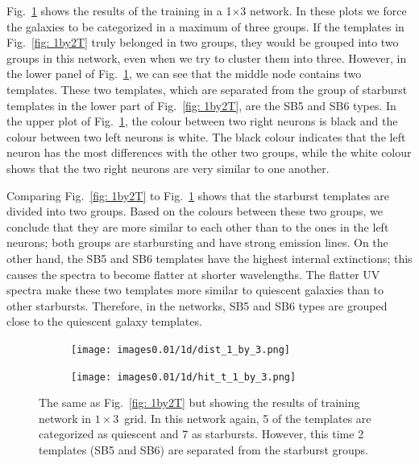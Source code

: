             Fig.~\ref{fig: 1by3T} shows the results of the training in a 1$\times$3 network.
            In these plots we force the galaxies to be categorized in a maximum of three groups. 
            If the templates in Fig.~\ref{fig: 1by2T} truly belonged in two groups, they would be grouped into two groups in this network, even when we try to cluster them into three. 
            However, in the lower panel of Fig.~\ref{fig: 1by3T}, we can see that the middle node contains two templates.
            These two templates, which are separated from the group of starburst templates in the lower part of Fig.~\ref{fig: 1by2T},  are the SB5 and SB6 types.
            In the upper plot of Fig.~\ref{fig: 1by3T}, the colour between two right neurons is black and the colour between two left neurons is white. 
            The black colour indicates that the left neuron has the most differences with the other two groups,
            while the white colour shows that the two right neurons are very similar to one another. 
            
            Comparing Fig.~\ref{fig: 1by2T} to Fig.~\ref{fig: 1by3T} shows that the starburst templates are divided into two groups. 
            Based on the colours between these two groups, we conclude that they are more similar to each other than to the ones in the left neurons; both groups are starbursting and have strong emission lines.
            On the other hand, the SB5 and SB6 templates have the highest internal extinctions; this causes the spectra to become flatter at shorter wavelengths. 
            The flatter UV spectra make these two templates more similar to quiescent galaxies than to other starbursts.
            Therefore, in the networks, SB5 and SB6 types are grouped close to the quiescent galaxy templates.
                
            \begin{figure}
                \begin{subfigure}[b]{0.45\textwidth}
                    \centering
                    \texttt{[image: images0.01/1d/dist\_1\_by\_3.png]}
                \end{subfigure}
                \hfill
                \begin{subfigure}[b]{0.45\textwidth}
                     \texttt{[image: images0.01/1d/hit\_t\_1\_by\_3.png]}
                \end{subfigure}
                \caption[Results of training network in $1\times3$~grid]{The same as Fig.~\ref{fig: 1by2T} but showing the results of training network in $1\times3$~grid. In this network again, 5 of the \citet{Kinney96} templates are categorized as quiescent and 7 as starbursts. However, this time 2 templates (SB5 and SB6) are separated from the starburst groups.}
                 \label{fig: 1by3T}
            \end{figure}
           
